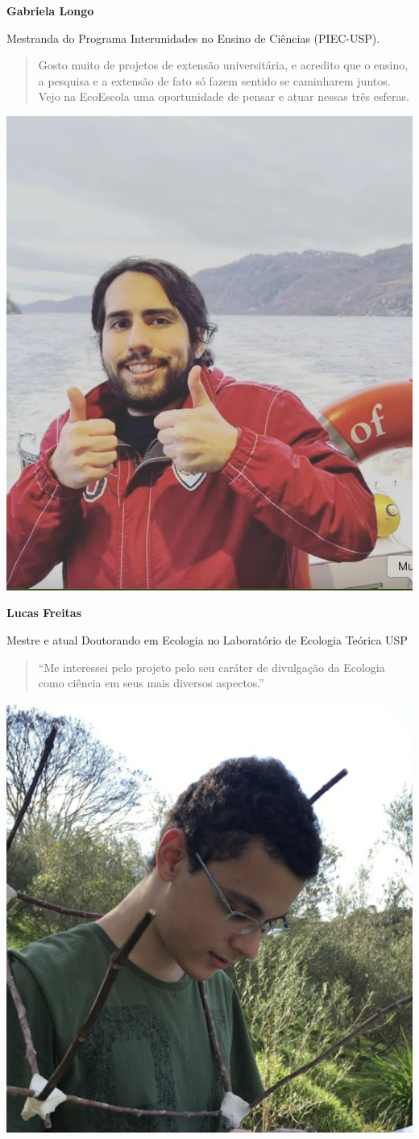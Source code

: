 \documentclass[
]{book}
\begin{document}
\textbf{Gabriela Longo}

Mestranda do Programa Interunidades no Ensino de Ciências (PIEC-USP).

\begin{quote}
Gosto muito de projetos de extensão universitária, e acredito que o ensino, a pesquisa e a extensão de fato só fazem sentido se caminharem juntos. Vejo na EcoEscola uma oportunidade de pensar e atuar nessas três esferas.
\end{quote}

\begin{center}\includegraphics[width=0.5\linewidth]{figs/lucas_picture} \end{center}

\textbf{Lucas Freitas}

Mestre e atual Doutorando em Ecologia no Laboratório de Ecologia Teórica USP

\begin{quote}
``Me interessei pelo projeto pelo seu caráter de divulgação da Ecologia como ciência em seus mais diversos aspectos.''
\end{quote}

\begin{center}\includegraphics[width=0.5\linewidth]{figs/pepe_picture} \end{center}
\end{document}
